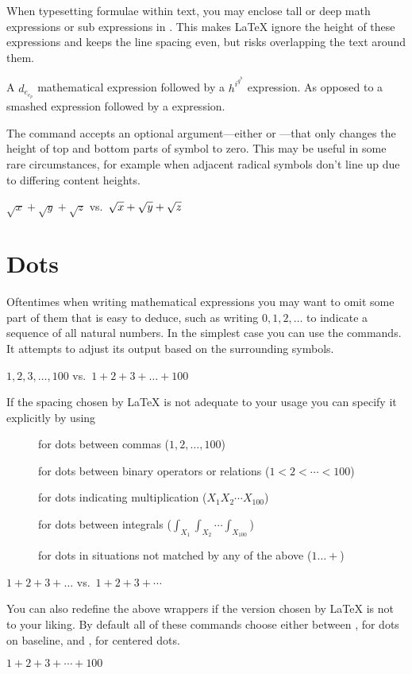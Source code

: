 When typesetting formulae within text, you may enclose tall or deep math
expressions or sub expressions in . This makes \LaTeX{} ignore the
height of these expressions and keeps the line spacing even, but risks
overlapping the text around them.
\begin{example}
A \(d_{e_{e_p}}\) mathematical
expression followed by a
\(h^{i^{g^h}}\) expression.
As opposed to a smashed 
expression followed by a
expression.
\end{example}

The  command accepts an optional argument---either  or
---that only changes the height of top and bottom parts of symbol to
zero. This may be useful in some rare circumstances, for example when adjacent
radical symbols don't line up due to differing content heights.
\begin{example}
\(  \sqrt{x} 
  + \sqrt{y} 
  + \sqrt{z}\)
vs.\
\(  \sqrt{x} 
  + \sqrt{\smash[b]{y}} 
  + \sqrt{z} \)
\end{example}

\section{Dots}

Oftentimes when writing mathematical expressions you may want to omit some part
of them that is easy to deduce, such as writing \(0, 1, 2, \dots\) to indicate
a sequence of all natural numbers. In the simplest case you can use the
\csi{dots} commands. It attempts to adjust its output based on the surrounding
symbols.
\begin{example}
\(1, 2, 3, \dots, 100\) vs.\
\(1 + 2 + 3 + \dots + 100\)
\end{example}

If the spacing chosen by \LaTeX{} is not adequate to your usage you can specify
it explicitly by using
\begin{description}
  \item[] for dots between commas (\(1, 2, \dotsc, 100\))
  \item[\csi{dotsb}] for dots between binary operators or relations (\(1 < 2 <
    \dotsb < 100\))
  \item[\csi{dotsm}] for dots indicating multiplication (\(X_1 X_2 \dotsm
    X_{100}\))
  \item[\csi{dotsi}] for dots between integrals (\(\int_{X_1}\int_{X_2}
    \dotsi \int_{X_{100}}\))
  \item[\csi{dotso}] for dots in situations not matched by any of the above
    (\(1\dotso+\))
\end{description}
\begin{example}
\(1 + 2 + 3 + \dots\) vs.\ 
\(1 + 2 + 3 + \dotsb\) 
\end{example}
You can also redefine the above wrappers if the version chosen by \LaTeX{} is
not to your liking. By default all of these commands choose either between
\csi{ldots}, for dots on baseline, and , for centered dots.
\begin{example}
\RenewDocumentCommand{%
  \dotsb}{}{\ldots}
\( 1 + 2 + 3 + \dotsb + 100 \)
\end{example}

